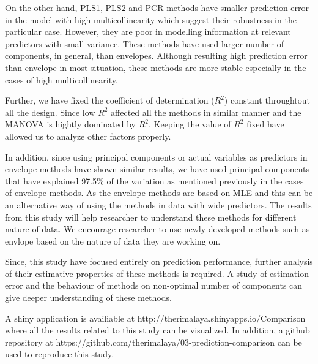 \documentclass[12pt,3p,authoryear]{elsarticle}
\begin{document}
On the other hand, PLS1, PLS2 and PCR methods have smaller prediction
error in the model with high multicollinearity which suggest their
robustness in the particular case. However, they are poor in modelling
information at relevant predictors with small variance. These methods
have used larger number of components, in general, than envelopes.
Although resulting high prediction error than envelope in most
situation, these methods are more stable especially in the cases of high
multicollinearity.

Further, we have fixed the coefficient of determination (\(R^2\))
constant throughtout all the design. Since low \(R^2\) affected all the
methods in similar manner and the MANOVA is hightly dominated by
\(R^2\). Keeping the value of \(R^2\) fixed have allowed us to analyze
other factors properly.

In addition, since using principal components or actual variables as
predictors in envelope methods have shown similar results, we have used
principal components that have explained 97.5\% of the variation as
mentioned previously in the cases of envelope methods. As the envelope
methods are based on MLE and this can be an alternative way of using the
methods in data with wide predictors. The results from this study will
help researcher to understand these methods for different nature of
data. We encourage researcher to use newly developed methods such as
envlope based on the nature of data they are working on.

Since, this study have focused entirely on prediction performance,
further analysis of their estimative properties of these methods is
required. A study of estimation error and the behaviour of methods on
non-optimal number of components can give deeper understanding of these
methods.

A shiny application \citep{shiny} is availiable at
http://therimalaya.shinyapps.io/Comparison where all the results related
to this study can be visualized. In addition, a github repository at
https://github.com/therimalaya/03-prediction-comparison can be used to
reproduce this study.

\hypertarget{refs}{}

\appendix



\renewcommand\refname{References}

\end{document}
